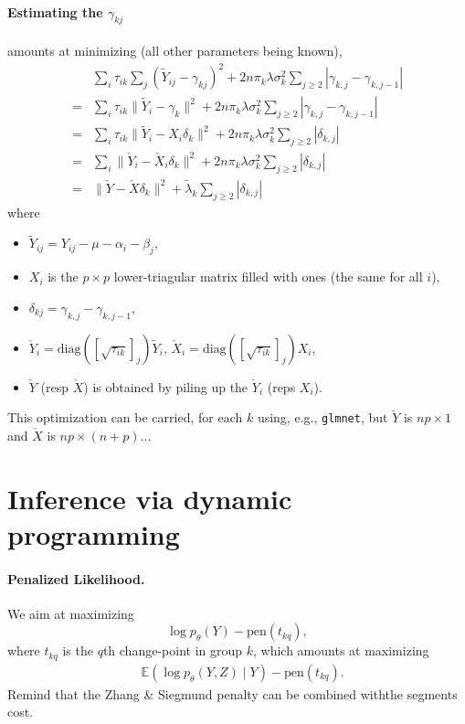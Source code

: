 \documentclass[a4paper, 11pt]{article}
\newcommand{\Esp}{\mathbb{E}}
\newcommand{\lambdat}{\widetilde{\lambda}}
\newcommand{\Xc}{\check{X}}
\newcommand{\Yc}{\check{Y}}
\newcommand{\Yt}{\widetilde{Y}}
\begin{document}
\paragraph{Estimating the $\gamma_{kj}$} amounts at minimizing (all other parameters being known),
\begin{align*}
 & \sum_i \tau_{ik} \sum_j (\Yt_{ij} -\gamma_{kj})^2  + 2 n \pi_k \lambda \sigma^2_k \sum_{j\geq 2} |\gamma_{k,j} - \gamma_{k, j-1}| \\
 = & \sum_i \tau_{ik} \|\Yt_i -\gamma_k\|^2  + 2 n \pi_k \lambda \sigma^2_k \sum_{j\geq 2} |\gamma_{k,j} - \gamma_{k, j-1}| \\
 = & \sum_i \tau_{ik} \|\Yt_i - X_i \delta_k\|^2  + 2 n \pi_k \lambda \sigma^2_k \sum_{j\geq 2} |\delta_{k,j}| \\
 = & \sum_i \|\Yc_i - \Xc_i \delta_k\|^2  + 2 n \pi_k \lambda \sigma^2_k \sum_{j\geq 2} |\delta_{k,j}| \\ 
 = & \|\Yc - \Xc \delta_k\|^2  + \lambdat_k \sum_{j\geq 2} |\delta_{k,j}| 
\end{align*}
where 
\begin{itemize}
 \item $\Yt_{ij} = Y_{ij} - \mu - \alpha_i - \beta_j$,
 \item $X_i$ is the $p \times p$ lower-triagular matrix filled with ones (the same for all $i$), 
 \item $\delta_{kj} = \gamma_{k,j} - \gamma_{k, j-1}$, 
 \item $\Yc_i = \text{diag}([\sqrt{\tau_{ik}}]_j) \Yt_i$, $\Xc_i = \text{diag}([\sqrt{\tau_{ik}}]_j) X_i$,
 \item $\Yc$ (resp $\Xc$) is obtained by piling up the $\Yc_i$ (reps $X_i$).
\end{itemize}
This optimization can be carried, for each $k$ using, e.g., {\tt glmnet}, but $\Yc$ is $np \times 1$ and $\Xc$ is $np \times (n+p)$...


\section{Inference via dynamic programming}

\paragraph{Penalized Likelihood.}
We aim at maximizing
$$
\log p_\theta(Y) - \text{pen}(t_{kq}),
$$
where $t_{kq}$ is the $q$th change-point in group $k$, which amounts at maximizing
\begin{align*}
 & \Esp \left(\log p_\theta(Y, Z)  \mid Y\right) - \text{pen}(t_{kq}).
\end{align*}
Remind that the Zhang \& Siegmund penalty can be combined withthe segments cost.
\end{document}
